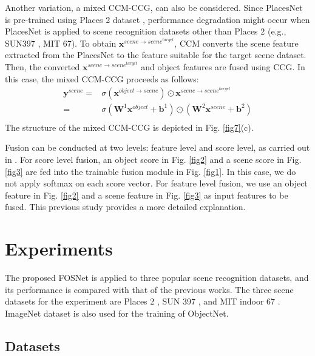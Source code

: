 \documentclass[journal,comsoc]{IEEEtran}
\begin{document}
Another variation, a mixed CCM-CCG, can also be considered. Since PlacesNet is pre-trained using Places 2 dataset \cite{b20}, performance degradation might occur when PlacesNet is applied to scene recognition datasets other than Places 2 (e.g., SUN397 \cite{b33}, MIT 67\cite{b34}). To obtain ${{\bm{x}}^{scene \to scen{e^{target}}}}$, CCM converts the scene feature extracted from the PlacesNet to the feature suitable for the target scene dataset. Then, the converted ${{\bm{x}}^{scene \to scen{e^{target}}}}$ and object features are fused using CCG. In this case, the mixed CCM-CCG proceeds as follows:
\begin{equation}
\begin{aligned} 
  {{\bm{y}}^{scene}} = {} & \sigma \left( {{{\bm{x}}^{object \to scene}}} \right) \odot {{\bm{x}}^{scene \to scen{e^{target}}}} \\ 
   = & \sigma \left( {{{\bm{W}}^1}{{\bm{x}}^{object}} + {{\bm{b}}^1}} \right) \odot \left( {{{\bm{W}}^2}{{\bm{x}}^{scene}} + {{\bm{b}}^2}} \right) \\ 
\label{eq13}
\end{aligned} 
\end{equation}
The structure of the mixed CCM-CCG is depicted in Fig. \ref{fig7}(c). 

Fusion can be conducted at two levels: feature level and score level, as carried out in \cite{b21}. For score level fusion, an object score in Fig. \ref{fig2} and a scene score in Fig. \ref{fig3} are fed into the trainable fusion module in Fig. \ref{fig1}. In this case, we do not apply softmax on each score vector. For feature level fusion, we use an object feature in Fig. \ref{fig2} and a scene feature in Fig. \ref{fig3} as input features to be fused. This previous study \cite{b21} provides a more detailed explanation. 



\section{Experiments}
\label{s4}

The proposed FOSNet is applied to three popular scene recognition datasets, and its performance is compared with that of the previous works. The three scene datasets for the experiment are Places 2 \cite{b20}, SUN 397 \cite{b33}, and MIT indoor 67 \cite{b34}. ImageNet dataset \cite{b19} is also used for the training of ObjectNet.

\subsection{Datasets}
\label{s41}
\end{document}
